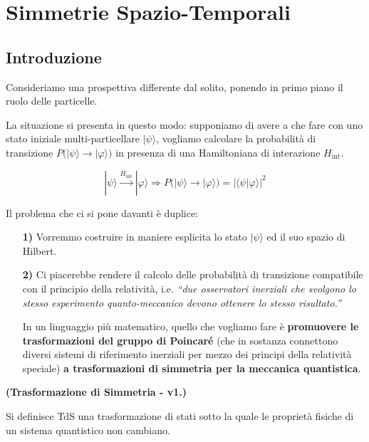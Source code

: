 \documentclass[../main.tex]{subfiles}
\begin{document}
\setchapterpreamble[u]{\margintoc}
\chapter[Simmetrie Spazio-Temporali]{Simmetrie Spazio-Temporali}
\label{ch:spacetime_symm}
\fboxsep =1pt %


\section{Introduzione}
Consideriamo una prospettiva differente dal solito, ponendo in primo piano il ruolo delle particelle.

La situazione si presenta in questo modo: supponiamo di avere a che fare con uno stato iniziale multi-particellare $|\psi\rangle$, vogliamo calcolare la probabilità di transizione \(P\big(|\psi\rangle\rightarrow|\varphi\rangle\big)\) in presenza di una Hamiltoniana di interazione \( H_\text{int}\).

\[
|\psi\rangle \xrightarrow[]{ H_\text{int}} |\varphi\rangle \Rightarrow P\big(|\psi\rangle\rightarrow|\varphi\rangle\big) = | \langle\psi|\varphi\rangle |^2
\]

Il problema che ci si pone davanti è duplice:
\begin{enumerate}
    \item[\textbf{1)}] Vorremmo costruire in maniere esplicita lo stato $|\psi\rangle$ ed il suo spazio di Hilbert.
    
    \item[\textbf{2)}] Ci piacerebbe rendere il calcolo delle probabilità di transizione compatibile con il principio della relatività, i.e. \textit{“due osservatori inerziali che svolgono lo stesso esperimento quanto-meccanico devono ottenere lo stesso risultato.”}

    In un linguaggio più matematico, quello che vogliamo fare è \textbf{promuovere le trasformazioni del gruppo di Poincaré} (che in sostanza connettono diversi sistemi di riferimento inerziali per mezzo dei principi della relatività speciale) \textbf{a trasformazioni di simmetria per la meccanica quantistica}.
\end{enumerate}

\begin{definition}
    \textbf{(Trasformazione di Simmetria - v1.)}

    Si definisce TdS una trasformazione di stati sotto la quale le proprietà fisiche di un sistema quantistico non cambiano.
    \label{def:symmetry_transf_states}
\end{definition}
\end{document}
